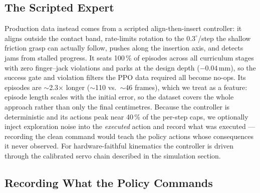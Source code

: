 \medskip
\noindent{}

\subsection{The Scripted Expert}

Production data instead comes from a scripted align-then-insert
controller: it aligns outside the contact band, rate-limits rotation
to the $0.3^{\circ}$/step the shallow friction grasp can actually
follow, pushes along the insertion axis, and detects jams from
stalled progress. It seats 100\,\% of episodes across all curriculum
stages with zero finger--jack violations and parks at the design
depth ($-0.04$\,mm), so the success gate and violation filters the
PPO data required all become no-ops. Its episodes are
$\sim$2.3$\times$ longer ($\sim$110 vs.\ $\sim$46 frames), which we
treat as a feature: episode length scales with the initial error, so
the dataset covers the whole approach rather than only the final
centimetres. Because the controller is deterministic and its actions
peak near 40\,\% of the per-step caps, we optionally inject
exploration noise into the \emph{executed} action and record what
was executed --- recording the clean command would teach the policy
actions whose consequences it never observed. For hardware-faithful
kinematics the controller is driven through the calibrated servo
chain described in the simulation section.

\subsection{Recording What the Policy Commands}


